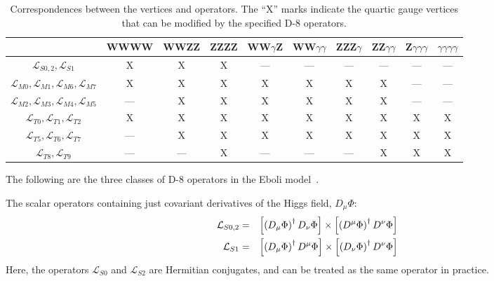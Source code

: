 \begin{table}[h!]
	\centering
	\begin{tabular}{|c|c|c|c||c|c|c|c|c|c|}
		\hline
		& WWWW & WWZZ & ZZZZ & WW$\gamma$Z & WW$\gamma\gamma$ & ZZZ$\gamma$ & ZZ$\gamma\gamma$ & Z$\gamma\gamma\gamma$ & $\gamma\gamma\gamma\gamma$ \\ \hline
		$\mathcal{L}_{S0,2}, \mathcal{L}_{S1}$ & X & X & X & — & — & — & — & — & — \\ \hline
		$\mathcal{L}_{M0}, \mathcal{L}_{M1}, \mathcal{L}_{M6}, \mathcal{L}_{M7}$ & X & X & X & X & X & X & X & — & — \\ \hline
		$\mathcal{L}_{M2}, \mathcal{L}_{M3}, \mathcal{L}_{M4}, \mathcal{L}_{M5}$ & — & X & X & X & X & X & X & — & — \\ \hline
		$\mathcal{L}_{T0}, \mathcal{L}_{T1}, \mathcal{L}_{T2}$ & X & X & X & X & X & X & X & X & X \\ \hline
		$\mathcal{L}_{T5}, \mathcal{L}_{T6}, \mathcal{L}_{T7}$ & — & X & X & X & X & X & X & X & X \\ \hline
		$\mathcal{L}_{T8}, \mathcal{L}_{T9}$ & — & — & X & — & — & — & X & X & X \\ \hline
	\end{tabular}
	\caption{Correspondences between the vertices and operators. The ``X'' marks indicate the quartic gauge vertices that can be modified by the specified D-8 operators.}
	\label{table:eboli_op}
\end{table}


The following are the three classes of D-8 operators in the Eboli model~\cite{eboli2006p}.

The scalar operators containing just covariant derivatives of the Higgs field, $D_\mu\Phi$:
\begin{eqnarray}
  {\cal L}_{S0,2} &=& \left [ \left ( D_\mu \Phi \right)^\dagger
 D_\nu \Phi \right ] \times
\left [ \left ( D^\mu \Phi \right)^\dagger
D^\nu \Phi \right ]
\\
  {\cal L}_{S1} &=& \left [ \left ( D_\mu \Phi \right)^\dagger
 D^\mu \Phi  \right ] \times
\left [ \left ( D_\nu \Phi \right)^\dagger
D^\nu \Phi \right ]
\end{eqnarray}
Here, the operators $\mathcal{L}_{S0}$ and $\mathcal{L}_{S2}$ are Hermitian conjugates, and can be treated as the same operator in practice.

